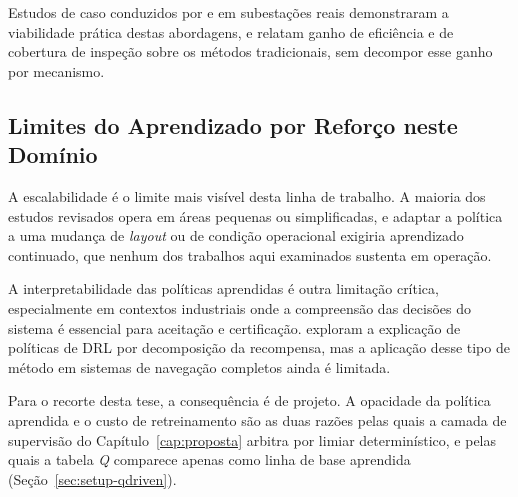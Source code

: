 Estudos de caso conduzidos por \cite{Lactec2022} e \cite{Iberdrola2022} em subestações reais demonstraram a viabilidade prática destas abordagens, e relatam ganho de eficiência e de cobertura de inspeção sobre os métodos tradicionais, sem decompor esse ganho por mecanismo.

\subsection{Limites do Aprendizado por Reforço neste Domínio}

A escalabilidade é o limite mais visível desta linha de trabalho. A maioria dos estudos revisados opera em áreas pequenas ou simplificadas, e adaptar a política a uma mudança de \textit{layout} ou de condição operacional exigiria aprendizado continuado, que nenhum dos trabalhos aqui examinados sustenta em operação.

A interpretabilidade das políticas aprendidas é outra limitação crítica, especialmente em contextos industriais onde a compreensão das decisões do sistema é essencial para aceitação e certificação.  exploram a explicação de políticas de \ac{DRL} por decomposição da recompensa, mas a aplicação desse tipo de método em sistemas de navegação completos ainda é limitada.

Para o recorte desta tese, a consequência é de projeto. A opacidade da política aprendida e o custo de retreinamento são as duas razões pelas quais a camada de supervisão do Capítulo~\ref{cap:proposta} arbitra por limiar determinístico, e pelas quais a tabela \textit{Q} comparece apenas como linha de base aprendida (Seção~\ref{sec:setup-qdriven}).


